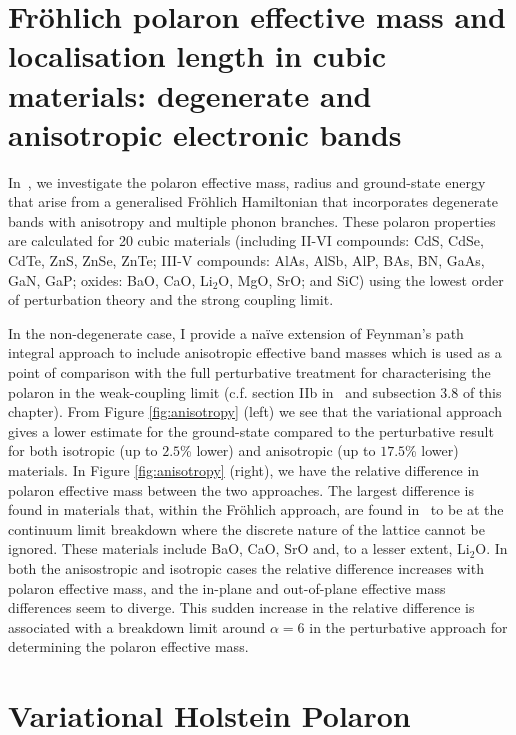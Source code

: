 \section{Fr\"ohlich polaron effective mass and localisation length in cubic materials:  degenerate and anisotropic electronic bands}

In~\cite{guster_frohlich_2021}, we investigate the polaron effective mass, radius and ground-state energy that arise from a generalised Fr\"ohlich Hamiltonian that incorporates degenerate bands with anisotropy and multiple phonon branches. These polaron properties are calculated for 20 cubic materials (including II-VI compounds: CdS, CdSe, CdTe, ZnS, ZnSe, ZnTe; III-V compounds: AlAs, AlSb, AlP, BAs, BN, GaAs, GaN, GaP; oxides: BaO, CaO, Li$_2$O, MgO, SrO; and SiC) using the lowest order of perturbation theory and the strong coupling limit. \newline

\noindent In the non-degenerate case, I provide a na\"ive extension of Feynman's path integral approach to include anisotropic effective band masses which is used as a point of comparison with the full perturbative treatment for characterising the polaron in the weak-coupling limit (c.f. section IIb in~\cite{guster_frohlich_2021} and subsection 3.8 of this chapter). From Figure \ref{fig:anisotropy} (left) we see that the variational approach gives a lower estimate for the ground-state compared to the perturbative result for both isotropic (up to $2.5$\% lower) and anisotropic (up to $17.5$\% lower) materials. In Figure \ref{fig:anisotropy} (right), we have the relative difference in polaron effective mass between the two approaches. The largest difference is found in materials that, within the Fr\"ohlich approach, are found in~\cite{guster_frohlich_2021} to be at the continuum limit breakdown where the discrete nature of the lattice cannot be ignored. These materials include BaO, CaO, SrO and, to a lesser extent, Li$_2$O. In both the anisostropic and isotropic cases the relative difference increases with polaron effective mass, and the in-plane and out-of-plane effective mass differences seem to diverge. This sudden increase in the relative difference is associated with a breakdown limit around $\alpha = 6$ in the perturbative approach for determining the polaron effective mass.

\section{Variational Holstein Polaron}

